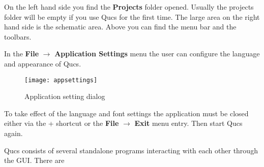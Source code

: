 On the left hand side you find the \textbf{Projects} folder opened.
Usually the projects folder will be empty if you use Qucs for the
first time.  The large area on the right hand side is the schematic
area.  Above you can find the menu bar and the toolbars.

\medskip

In the \textbf{File} $\rightarrow$ \textbf{Application Settings} menu
the user can configure the language and appearance of Qucs.

\begin{figure}[ht]
  \centering
  \texttt{[image: appsettings]}
  \caption{Application setting dialog}
  \label{fig:appsettings}
\end{figure}
\FloatBarrier

To take effect of the language and font settings the application must
be closed either via the \Ctrl+ shortcut or the
\textbf{File} $\rightarrow$ \textbf{Exit} menu entry.  Then start Qucs
again.


Qucs consists of several standalone programs interacting with each
other through the GUI.  There are

